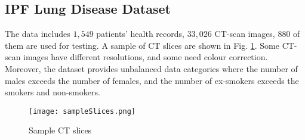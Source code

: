 \documentclass[conference]{IEEEtran}
\begin{document}
\subsection{IPF Lung Disease Dataset} 
The data includes $1,549$ patients' health records, $33,026$ CT-scan images, $880$ of them are used for testing. A sample of CT slices are shown in Fig. \ref{fig:sam_slices}. Some CT-scan images have different resolutions, and some need colour correction. Moreover, the dataset provides unbalanced data categories where the number of males exceeds the number of females, and the number of ex-smokers exceeds the smokers and non-smokers. 
\begin{figure}
    \centering
    \texttt{[image: sampleSlices.png]}
    \caption{Sample CT slices}
    \label{fig:sam_slices}
\end{figure}

\end{document}
